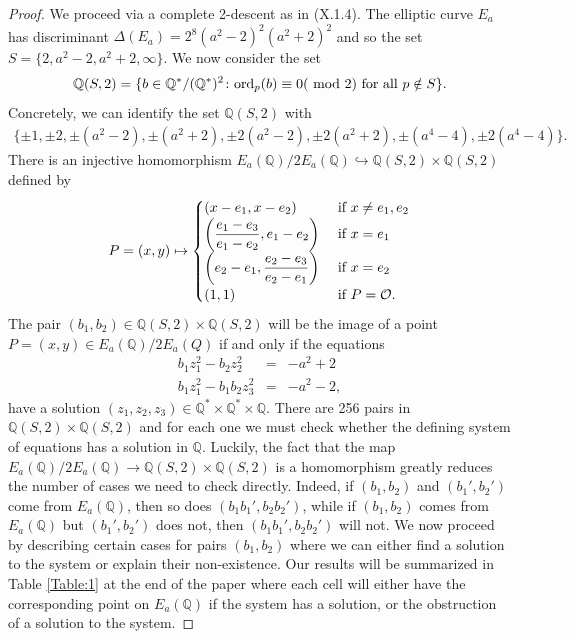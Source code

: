\documentclass{article}
\newcommand{\Q}{\mathbb{Q}}
\theoremstyle{definition}
\begin{document}
\begin{proof}
We proceed via a complete 2-descent as in \cite{silverman2009arithmetic} (X.1.4). The elliptic curve $E_a$ has discriminant $\Delta(E_a) = 2^8(a^2-2)^2(a^2+2)^2$ and so the set $S = \{2, a^2-2, a^2+2, \infty\}$. We now consider the set 
\begin{eqnarray*}
    \Q(S,2) = \{ b \in \Q^*/(\Q^*)^2 \colon \textnormal{ord}_p(b) \equiv 0 (\textnormal{ mod } 2) \textnormal{ for all } p \notin S\}.
\end{eqnarray*}
Concretely, we can identify the set $\Q(S,2)$ with 
\begin{eqnarray*}
    \{ \pm 1, \pm 2, \pm (a^2-2), \pm (a^2+2), \pm 2(a^2-2), \pm 2(a^2+2), \pm (a^4-4), \pm2(a^4-4) \}.
\end{eqnarray*}
There is an injective homomorphism $E_a(\Q)/2E_a(\Q) \hookrightarrow \Q(S,2) \times \Q(S,2)$ defined by
\begin{eqnarray*}
    P = (x,y) \mapsto \begin{cases}
        (x - e_1, x- e_2) & \textnormal{ if } x \neq e_1, e_2 \\
        \left(\dfrac{e_1 - e_3}{e_1 - e_2}, e_1 - e_2 \right) & \textnormal{ if } x = e_1 \\
        \left( e_2 - e_1, \dfrac{e_2 - e_3}{e_2 - e_1} \right) & \textnormal{ if } x = e_2 \\
        (1,1) & \textnormal{ if } P = \mathcal{O}.
    \end{cases}
\end{eqnarray*}
The pair $(b_1,b_2) \in \Q(S,2) \times \Q(S,2)$ will be the image of a point $P = (x,y) \in E_a(\Q)/2E_a(Q)$ if and only if the equations 
\begin{eqnarray}
    b_1 z_1^2 - b_2z_2^2 &=& -a^2 + 2 \\
    b_1z_1^2 - b_1b_2 z_3^2 &=& -a^2 - 2,
\end{eqnarray}
have a solution $(z_1, z_2, z_3) \in \Q^* \times \Q^* \times \Q$. There are 256 pairs in $\Q(S,2) \times \Q(S,2)$ and for each one we must check whether the defining system of equations has a solution in $\Q$. Luckily, the fact that the map $E_a(\Q)/2E_a(\Q) \rightarrow \Q(S,2) \times \Q(S,2)$ is a homomorphism greatly reduces the number of cases we need to check directly. Indeed, if $(b_1,b_2)$ and $(b_1',b_2')$ come from $E_a(\Q)$, then so does $(b_1b_1', b_2b_2')$, while if $(b_1,b_2)$ comes from $E_a(\Q)$ but $(b_1',b_2')$ does not, then $(b_1b_1', b_2b_2')$ will not. We now proceed by describing certain cases for pairs $(b_1,b_2)$ where we can either find a solution to the system or explain their non-existence. Our results will be summarized in Table \ref{Table:1} at the end of the paper where each cell will either have the corresponding point on $E_a(\Q)$ if the system has a solution, or the obstruction of a solution to the system.

\end{proof}
\end{document}
